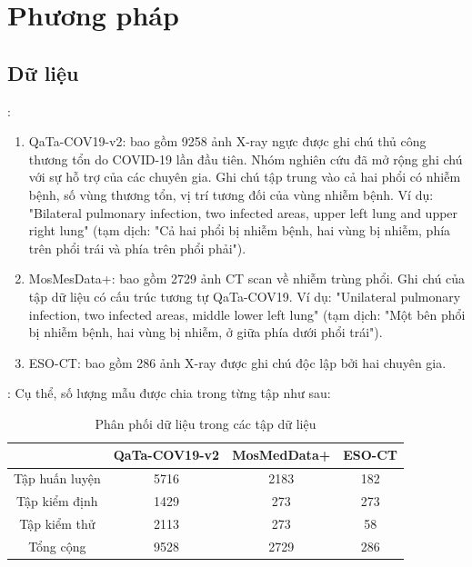 \section{Phương pháp}

\subsection{Dữ liệu}
\begin{frame}{\secname: \subsecname}
\begin{enumerate}
    \item QaTa-COV19-v2: bao gồm 9258 ảnh X-ray ngực được ghi chú thủ công thương tổn do COVID-19 lần đầu tiên. Nhóm nghiên cứu đã mở rộng ghi chú với sự hỗ trợ của các chuyên gia. Ghi chú tập trung vào cả hai phổi có nhiễm bệnh, số vùng thương tổn, vị trí tương đối của vùng nhiễm bệnh. Ví dụ: "Bilateral pulmonary infection, two infected areas, upper left lung and upper right lung" (tạm dịch: "Cả hai phổi bị nhiễm bệnh, hai vùng bị nhiễm, phía trên phổi trái và phía trên phổi phải").
    \item MosMesData+: bao gồm 2729 ảnh CT scan về nhiễm trùng phổi. Ghi chú của tập dữ liệu có cấu trúc tương tự QaTa-COV19. Ví dụ: "Unilateral pulmonary infection, two infected areas, middle lower left lung" (tạm dịch: "Một bên phổi bị nhiễm bệnh, hai vùng bị nhiễm, ở giữa phía dưới phổi trái").
    \item ESO-CT: bao gồm 286 ảnh X-ray được ghi chú độc lập bởi hai chuyên gia.
\end{enumerate}
\end{frame}

\begin{frame}{\secname: \subsecname}
Cụ thể, số lượng mẫu được chia trong từng tập như sau:

\begin{table}[H]
    \centering
    \begin{tabular}{cccc}
    \hline
    & \textbf{QaTa-COV19-v2} & \textbf{MosMedData+} & \textbf{ESO-CT} \\
    \hline
    Tập huấn luyện & 5716 & 2183 & 182 \\
    Tập kiểm định & 1429 & 273 & 273 \\
    Tập kiểm thử & 2113 & 273 & 58 \\
    \hline
    Tổng cộng & 9528 & 2729 & 286 \\
    \hline
    \end{tabular}
    \caption{Phân phối dữ liệu trong các tập dữ liệu}
\end{table}

\end{frame}

